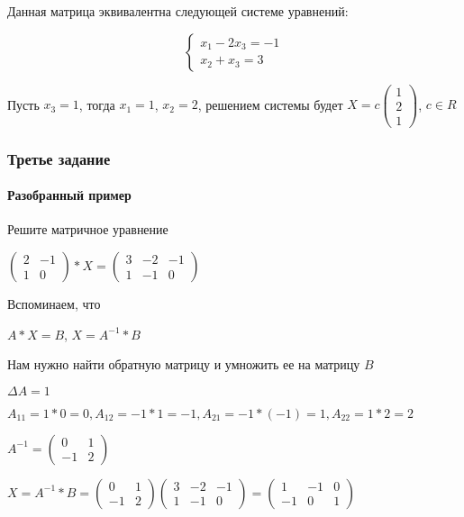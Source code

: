 \documentclass{article}
\begin{document}
\begin{flushleft}
Данная матрица эквивалентна следующей системе уравнений:

\begin{equation}
    \begin{cases}
        x_1 - 2x_3 = -1 \\
        x_2 + x_3 = 3
    \end{cases}
\end{equation}

Пусть $x_3 = 1$, тогда $x_1 = 1$, $x_2 = 2$, решением системы будет $X = c \begin{pmatrix}
    1 \\
    2 \\
    1
\end{pmatrix}$, $c \in R$


\subsubsection{Третье задание}

\paragraph{Разобранный пример}

Решите матричное уравнение

$\begin{pmatrix}
    2 & -1 \\
    1 & 0
\end{pmatrix} * X = \begin{pmatrix}
    3 & -2 & -1 \\
    1 & -1 & 0
\end{pmatrix}$

\bigskip

Вспоминаем, что

$A * X = B$, $X = A^{-1} * B$

Нам нужно найти обратную матрицу и умножить ее на матрицу $B$

\bigskip

$\Delta A = 1$

$A_{11} = 1 * 0 = 0 , A_{12} = -1 * 1 = -1, A_{21} = -1 * (-1) = 1, A_{22} = 1 * 2 = 2$

$A^{-1} = \begin{pmatrix}
    0 & 1 \\
    -1 & 2
\end{pmatrix}$

\bigskip

$X = A^{-1} * B = \begin{pmatrix}
    0 & 1 \\
    -1 & 2
\end{pmatrix} \begin{pmatrix}
    3 & -2 & -1 \\
    1 & -1 & 0
\end{pmatrix} = \begin{pmatrix}
    1 & -1 & 0 \\
    -1 & 0 & 1
\end{pmatrix}$


\end{flushleft}
\end{document}
